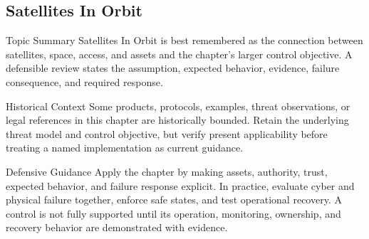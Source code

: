 \documentclass[11pt,letterpaper]{article}
\begin{document}
\subsection*{Satellites In Orbit}
\begin{CornellNotesTable}
\end{CornellNotesTable}
\begin{CornellSummaryBox}{Topic Summary}
Satellites In Orbit is best remembered as the connection between satellites, space, access, and assets and the chapter's larger control objective. A defensible review states the assumption, expected behavior, evidence, failure consequence, and required response.
\end{CornellSummaryBox}
\begin{CornellWarningBox}{Historical Context}
Some products, protocols, examples, threat observations, or legal references in this chapter are historically bounded. Retain the underlying threat model and control objective, but verify present applicability before treating a named implementation as current guidance.
\end{CornellWarningBox}
\begin{CornellOverviewBox}{Defensive Guidance}
Apply the chapter by making assets, authority, trust, expected behavior, and failure response explicit. In practice, evaluate cyber and physical failure together, enforce safe states, and test operational recovery. A control is not fully supported until its operation, monitoring, ownership, and recovery behavior are demonstrated with evidence.
\end{CornellOverviewBox}
\end{document}
